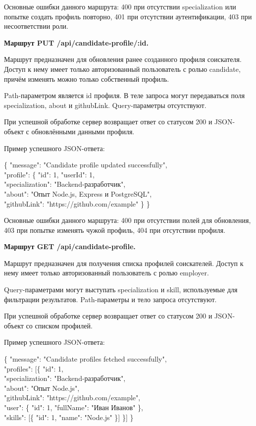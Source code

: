 Основные ошибки данного маршрута: 400 при отсутствии specialization или попытке создать профиль повторно, 401 при отсутствии аутентификации, 403 при несоответствии роли.

\textbf{Маршрут PUT /api/candidate-profile/:id.}

Маршрут предназначен для обновления ранее созданного профиля соискателя. Доступ к нему имеет только авторизованный пользователь с ролью candidate, причём изменять можно только собственный профиль.

Path-параметром является id профиля. В теле запроса могут передаваться поля specialization, about и githubLink. Query-параметры отсутствуют.

При успешной обработке сервер возвращает ответ со статусом 200 и JSON-объект с обновлёнными данными профиля.

Пример успешного JSON-ответа:

\begin{flushleft}
	\small\ttfamily
	\{ "message": "Candidate profile updated successfully",\\
	"profile": \{ "id": 1, "userId": 1,\\
	"specialization": "Backend-разработчик",\\
	"about": "Опыт Node.js, Express и PostgreSQL",\\
	"githubLink": "https://github.com/example" \} \}
\end{flushleft}

Основные ошибки данного маршрута: 400 при отсутствии полей для обновления, 403 при попытке изменять чужой профиль, 404 при отсутствии профиля.

\textbf{Маршрут GET /api/candidate-profile.}

Маршрут предназначен для получения списка профилей соискателей. Доступ к нему имеет только авторизованный пользователь с ролью employer.

Query-параметрами могут выступать specialization и skill, используемые для фильтрации результатов. Path-параметры и тело запроса отсутствуют.

При успешной обработке сервер возвращает ответ со статусом 200 и JSON-объект со списком профилей.

Пример успешного JSON-ответа:

\begin{flushleft}
	\small\ttfamily
	\{ "message": "Candidate profiles fetched successfully",\\
	"profiles": [\{ "id": 1,\\
	"specialization": "Backend-разработчик",\\
	"about": "Опыт Node.js",\\
	"githubLink": "https://github.com/example",\\
	"user": \{ "id": 1, "fullName": "Иван Иванов" \},\\
	"skills": [\{ "id": 1, "name": "Node.js" \}] \}] \}
\end{flushleft}

